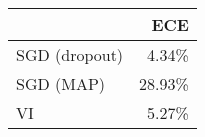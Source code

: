 \begin{tabular}{lr}
\toprule
{} &    ECE \\
\midrule
SGD (dropout) &  4.34\% \\
SGD (MAP)     & 28.93\% \\
VI            &  5.27\% \\
\bottomrule
\end{tabular}
